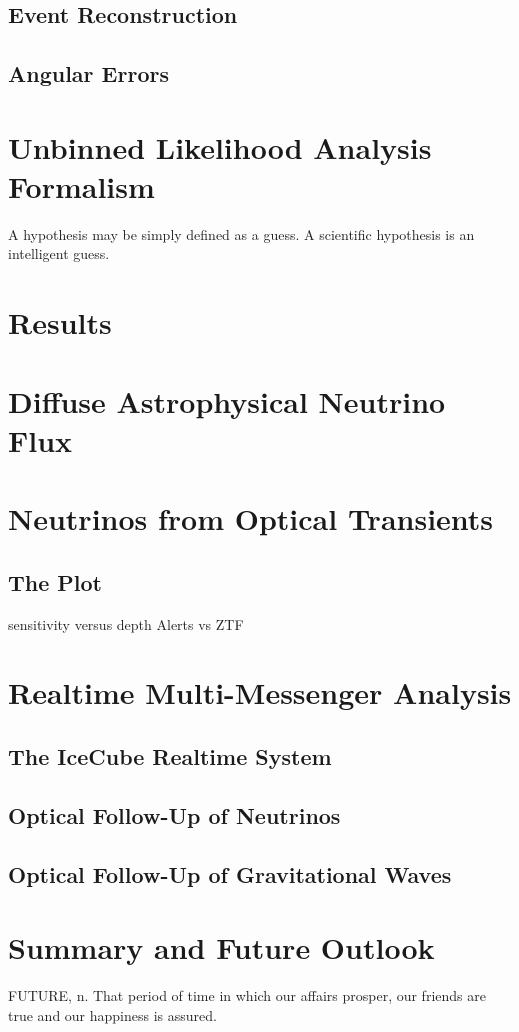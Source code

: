 \subsection{Event Reconstruction}
\subsection{Angular Errors}
\section{Unbinned Likelihood Analysis Formalism}
\begin{fquote} A hypothesis may be simply defined as a guess. A scientific hypothesis is an intelligent guess. 
\end{fquote}

\section{Results}
\section{Diffuse Astrophysical Neutrino Flux}

\section{Neutrinos from Optical Transients}
\subsection{The Plot}
sensitivity versus depth
Alerts vs ZTF

\section{Realtime Multi-Messenger Analysis}
\subsection{The IceCube Realtime System}
\subsection{Optical Follow-Up of Neutrinos}

\subsection{Optical Follow-Up of Gravitational Waves}
\section{Summary and Future Outlook}
\begin{fquote} FUTURE, n. That period of time in which our affairs prosper, our friends are true and our happiness is assured.  
\end{fquote}